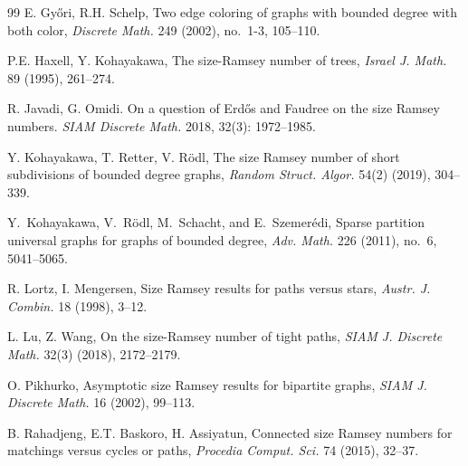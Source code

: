 \documentclass[11pt]{article}
\theoremstyle{definition}
\theoremstyle{remark}
\begin{document}
\begin{thebibliography}{99}
E. Gy\H{o}ri, R.H. Schelp, Two edge coloring of graphs with bounded degree with both color,
\textit{Discrete Math.} 249 (2002), no.~1-3, 105--110.



P.E. Haxell, Y. Kohayakawa, The size-Ramsey number of trees,
\emph{Israel J. Math.} 89 (1995), 261--274.


R. Javadi, G. Omidi.
On a question of Erd\H{o}s and Faudree on the size Ramsey numbers.
\emph{SIAM Discrete Math.} 2018, 32(3): 1972--1985.


Y. Kohayakawa, T. Retter, V. R\"{o}dl, The size Ramsey number of short subdivisions of bounded degree graphs,
\emph{Random Struct. Algor.} 54(2) (2019), 304--339.



Y.~Kohayakawa, V.~R\"odl, M.~Schacht, and E.~Szemer\'edi,
Sparse partition universal graphs for graphs of bounded degree,
\textit{Adv. Math.} 226 (2011), no.~6, 5041--5065.

R. Lortz, I. Mengersen, Size Ramsey results for paths versus stars,
\emph{Austr. J. Combin.} 18 (1998), 3--12.

L. Lu, Z. Wang, On the size-Ramsey number of tight paths,
\emph{SIAM J. Discrete Math.} 32(3) (2018), 2172--2179.

O. Pikhurko, Asymptotic size Ramsey results for bipartite graphs,
\emph{SIAM J. Discrete Math.} 16 (2002), 99--113.



B. Rahadjeng, E.T. Baskoro, H. Assiyatun, Connected size Ramsey numbers for matchings versus cycles or paths,
\emph{Procedia Comput. Sci.} 74 (2015), 32--37.




\end{thebibliography}
\end{document}
